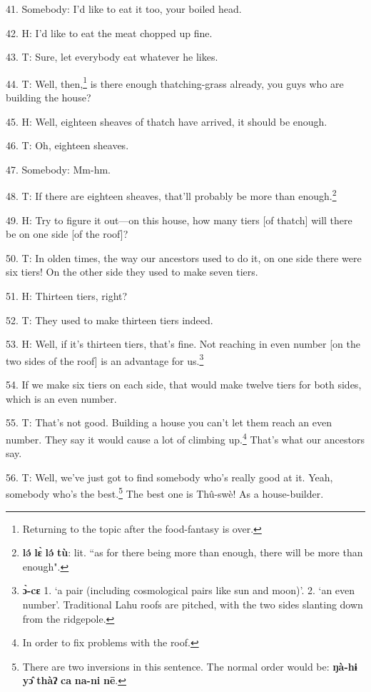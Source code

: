 41. Somebody: I'd like to eat it too, your boiled head.

42. H: I'd like to eat the meat chopped up fine.

43. T: Sure, let everybody eat whatever he likes.

44. T: Well, then,\footnote{Returning to the topic after the food-fantasy is over.} is there enough thatching-grass already, you guys who are
building the house?

45. H: Well, eighteen sheaves of thatch have arrived, it should be enough.

46. T: Oh, eighteen sheaves.

47. Somebody: Mm-hm.

48. T: If there are eighteen sheaves, that'll probably be more than enough.\footnote{\textbf{lə́} \textbf{lɛ̀} \textbf{lə́} \textbf{tù}: lit. ``as for there being more than enough, there will be more than enough".}

49. H: Try to figure it out---on this house, how many tiers [of thatch] will there
be on one side [of the roof]?

50. T: In olden times, the way our ancestors used to do it, on one side there were
six tiers! On the other side they used to make seven tiers.

51. H: Thirteen tiers, right?

52. T: They used to make thirteen tiers indeed.

53. H: Well, if it's thirteen tiers, that's fine. Not reaching in even number
[on the two sides of the roof] is an advantage for us.\footnote{\textbf{ɔ̀-cɛ} 1. `a pair (including cosmological pairs like sun and moon)'. 2. `an even number'. Traditional Lahu roofs are pitched, with the two sides slanting down from the ridgepole.}

54. If we make six tiers on each side, that would make twelve tiers for both sides,
which is an even number.

55. T: That's not good. Building a house you can't let them reach an even number.
They say it would cause a lot of climbing up.\footnote{In order to fix problems with the roof.} That's what our ancestors say.

56. T: Well, we've just got to find somebody who's really good at it. Yeah, somebody
who's the best.\footnote{There are two inversions in this sentence. The normal order would be: \textbf{ŋà-hɨ} \textbf{yɔ̂} \textbf{thàʔ} \textbf{ca} \textbf{na-ni} \textbf{nē}.} The best one is Thû-swè! As a house-builder.

